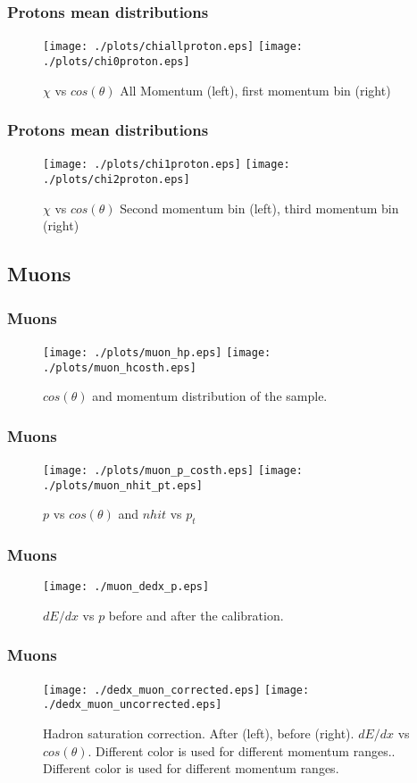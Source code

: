 \documentclass{beamer}
\begin{document}
\begin{frame}\frametitle{Protons mean distributions}
\begin{figure}[!htp]
\centering
\texttt{[image: ./plots/chiallproton.eps]}
\texttt{[image: ./plots/chi0proton.eps]}
\caption{$\chi$ vs $cos(\theta)$ All Momentum (left), first momentum bin (right)}
\end{figure}
\end{frame}

\begin{frame}\frametitle{Protons mean distributions}
\begin{figure}[!htp]
\centering
\texttt{[image: ./plots/chi1proton.eps]}
\texttt{[image: ./plots/chi2proton.eps]}
\caption{$\chi$ vs $cos(\theta)$ Second momentum bin (left), third momentum bin (right)}
\end{figure}
\end{frame}

\subsection{Muons}
\begin{frame}\frametitle{Muons}
\begin{figure}
\texttt{[image: ./plots/muon\_hp.eps]} 
\texttt{[image: ./plots/muon\_hcosth.eps]} 
\caption{$cos(\theta)$ and momentum distribution of the sample.}
\end{figure}
\end{frame}

\begin{frame}\frametitle{Muons}
\begin{figure}
\texttt{[image: ./plots/muon\_p\_costh.eps]} 
\texttt{[image: ./plots/muon\_nhit\_pt.eps]} 
\caption{$p$ vs $cos(\theta)$ and $nhit$ vs $p_{t}$}
\end{figure}
\end{frame}

\begin{frame}\frametitle{Muons}
\begin{figure}
\texttt{[image: ./muon\_dedx\_p.eps]} 
\caption{$dE/dx$ vs $p$ before and after the calibration.}
\end{figure}
\end{frame}

\begin{frame}\frametitle{Muons}
\begin{figure}
\texttt{[image: ./dedx\_muon\_corrected.eps]} 
\texttt{[image: ./dedx\_muon\_uncorrected.eps]} 
\caption{Hadron saturation correction. After (left), before (right). $dE/dx$ vs $cos(\theta)$. Different color is used for different momentum ranges.. Different color is used for different momentum ranges.}
\end{figure}
\end{frame}
\end{document}
